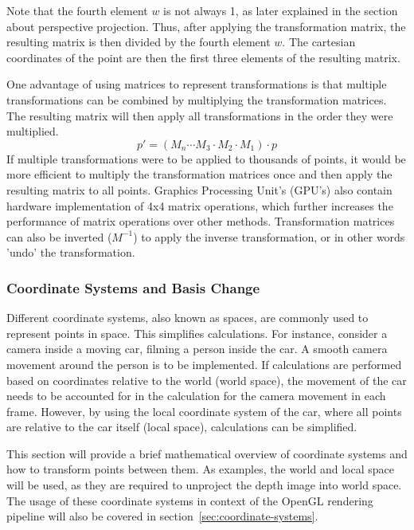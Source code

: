 Note that the fourth element $w$ is not always 1, as later explained in the section about perspective projection.
Thus, after applying the transformation matrix, the resulting matrix is then divided by the fourth element $w$.
The cartesian coordinates of the point are then the first three elements of the resulting matrix.

One advantage of using matrices to represent transformations is that multiple transformations can be combined by
multiplying the transformation matrices.
The resulting matrix will then apply all transformations in the order they were multiplied.
\begin{equation}
    p' = (M_n \cdots M_3 \cdot M_2 \cdot M_1) \cdot p
\end{equation}
If multiple transformations were to be applied to thousands of points,
it would be more efficient to multiply the transformation matrices once and then apply the resulting matrix to all points.
Graphics Processing Unit's (GPU's) also contain hardware implementation of 4x4 matrix operations,
which further increases the performance of matrix operations over other methods.
Transformation matrices can also be inverted ($M^{-1}$) to apply the inverse transformation, or in other words 'undo' the transformation.

\cite{dorner_virtual_2019}
\subsubsection{Coordinate Systems and Basis Change}

Different coordinate systems, also known as spaces, are commonly used to represent points in space.
This simplifies calculations.
For instance, consider a camera inside a moving car, filming a person inside the car.
A smooth camera movement around the person is to be implemented.
If calculations are performed based on coordinates relative to the world (world space),
the movement of the car needs to be accounted for in the calculation for the camera movement in each frame.
However, by using the local coordinate system of the car, where all points are relative to the car itself (local space),
calculations can be simplified.

This section will provide a brief mathematical overview of coordinate systems and how to transform points between them.
As examples, the world and local space will be used, as they are required to unproject the depth image into world space.
The usage of these coordinate systems in context of the OpenGL rendering pipeline will also be covered in section~\ref{sec:coordinate-systems}.

